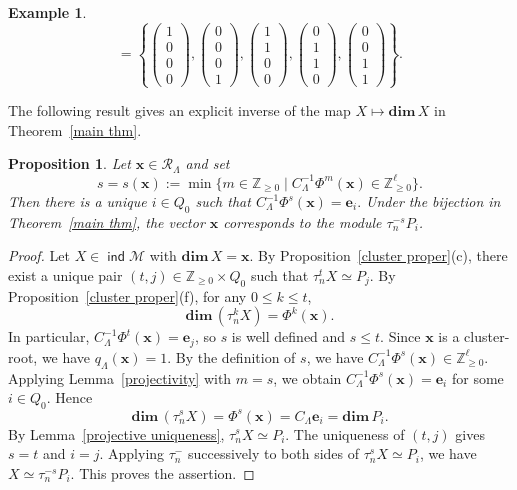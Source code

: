 \documentclass[11pt,a4paper]{amsart}
\newtheorem{proposition}[theorem]{Proposition}
\theoremstyle{definition}
\newtheorem{example}[theorem]{Example}
\numberwithin{equation}{section}
\newcommand{\Z}{\mathbb{Z}}
\newcommand{\e}{\mathbf{e}}
\newcommand{\x}{\mathbf{x}}
\newcommand{\0}{\mathbf{0}}
\newcommand{\dimv}{\mathbf{dim}\,}
\DeclareMathOperator{\ind}{\mathsf{ind}}
\begin{document}
\begin{example}
\[		=
		\left\{
		\begin{pmatrix}1\\0\\0\\0\end{pmatrix},
		\begin{pmatrix}0\\0\\0\\1\end{pmatrix},
		\begin{pmatrix}1\\1\\0\\0\end{pmatrix},
		\begin{pmatrix}0\\1\\1\\0\end{pmatrix},
		\begin{pmatrix}0\\0\\1\\1\end{pmatrix}
		\right\}.
		\]
	\end{example}
		

	
		The following result gives an explicit inverse
		of the map $X\mapsto\dimv X$
		in Theorem~\ref{main thm}.
	
	
	
	\begin{proposition}
		Let $\x\in\mathcal R_\Lambda$ and set
		\[
		s=s(\x):=
		\min\{m\in\mathbb Z_{\geq0}
		\mid C_\Lambda^{-1}\Phi^m(\x)\in \Z^{\ell}_{\ge 0}\}.
		\]
		Then there is a unique $i\in Q_0$ such that
		$
		C_\Lambda^{-1}\Phi^s(\x)=\e_i.
		$
		Under the bijection in Theorem~\ref{main thm},
		the vector $\x$ corresponds to the module
		$\tau_n^{-s}P_i$.
	\end{proposition}
	
	
	\begin{proof}
		Let $X\in\ind\mathcal M$ with $\dimv X=\x$.
		By Proposition~\ref{cluster proper}(c), there exist a unique pair $(t,j)\in \mathbb Z_{\geq0}\times Q_0$ such that 
		$\tau_n^tX\simeq P_j$.
		By Proposition~\ref{cluster proper}(f), for any $0\leq k\leq t$, 
		\[
		\dimv(\tau_n^kX)=\Phi^k(\x).
		\]
		In particular,
		$C_\Lambda^{-1}\Phi^t(\x)=\e_j$,
		so $s$ is well defined and $s\leq t$. 		
		Since $\x$ is a cluster-root, we have
		$q_\Lambda(\x)=1$. By the definition of $s$, we have 
		$C_\Lambda^{-1}\Phi^s(\x)\in\Z_{\geq0}^{\ell}$.
		Applying Lemma~\ref{projectivity} with $m=s$, we obtain
		$C_\Lambda^{-1}\Phi^s(\x)=\e_i$	 	
		for some $i\in Q_0$.
		Hence
		\[
		\dimv(\tau_n^sX)
		=\Phi^s(\x)
		=C_\Lambda\e_i
		=\dimv P_i.
		\]
		By Lemma~\ref{projective uniqueness},
		$\tau_n^sX\simeq P_i$.
		The uniqueness of $(t,j)$ gives $s=t$ and $i=j$.
	Applying $\tau_n^-$ successively to both sides of $\tau_n^sX\simeq P_i$, we have
		$
		X\simeq\tau_n^{-s}P_i.
		$
		This proves the assertion.
	\end{proof}
		
\end{document}

